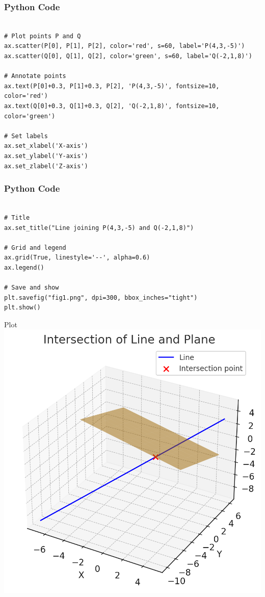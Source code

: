 \documentclass{beamer}
\begin{document}
\begin{frame}[fragile]
    \frametitle{Python Code}
    \begin{lstlisting}
    
# Plot points P and Q
ax.scatter(P[0], P[1], P[2], color='red', s=60, label='P(4,3,-5)')
ax.scatter(Q[0], Q[1], Q[2], color='green', s=60, label='Q(-2,1,8)')

# Annotate points
ax.text(P[0]+0.3, P[1]+0.3, P[2], 'P(4,3,-5)', fontsize=10, color='red')
ax.text(Q[0]+0.3, Q[1]+0.3, Q[2], 'Q(-2,1,8)', fontsize=10, color='green')

# Set labels
ax.set_xlabel('X-axis')
ax.set_ylabel('Y-axis')
ax.set_zlabel('Z-axis')

    \end{lstlisting}
\end{frame}

\begin{frame}[fragile]
    \frametitle{Python Code}
    \begin{lstlisting}
    
# Title
ax.set_title("Line joining P(4,3,-5) and Q(-2,1,8)")

# Grid and legend
ax.grid(True, linestyle='--', alpha=0.6)
ax.legend()

# Save and show
plt.savefig("fig1.png", dpi=300, bbox_inches="tight")
plt.show()

    \end{lstlisting}
\end{frame}

\begin{frame}{Plot}
   \centering
   \includegraphics[width=\columnwidth, height=0.8\textheight, keepaspectratio]{beamer/figs/fig1.jpg}
   \label{fig:Beamer/figs/fig1.png}
\end{frame}
\end{document}
